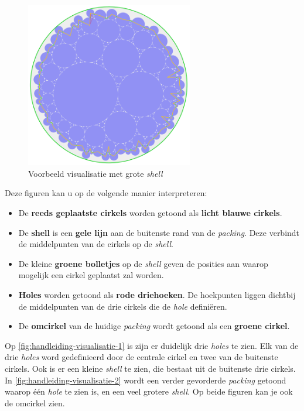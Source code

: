 \documentclass[12pt,a4paper,oneside]{book}
\begin{document}
\begin{figure}
  \centering
  \includegraphics[width=0.65\textwidth]{handleiding-visualisatie-2.png}
  \caption{Voorbeeld visualisatie met grote \textit{shell}} \label{fig:handleiding-visualisatie-2}
\end{figure}

Deze figuren kan u op de volgende manier interpreteren:

\begin{itemize}  
\item De \textbf{reeds geplaatste cirkels} worden getoond als \textbf{licht blauwe cirkels}.
\item De \textbf{shell} is een \textbf{gele lijn} aan de buitenste rand van de \textit{packing}. Deze verbindt de middelpunten van de cirkels op de \textit{shell}.
\item De kleine \textbf{groene bolletjes} op de \textit{shell} geven de posities aan waarop mogelijk een cirkel geplaatst zal worden.
\item \textbf{Holes} worden getoond als \textbf{rode driehoeken}. De hoekpunten liggen dichtbij de middelpunten van de drie cirkels die de \textit{hole} definiëren.
\item De \textbf{omcirkel} van de huidige \textit{packing} wordt getoond als een \textbf{groene cirkel}.
\end{itemize}

Op \autoref{fig:handleiding-visualisatie-1} is zijn er duidelijk drie \textit{holes} te zien.
Elk van de drie \textit{holes} word gedefinieerd door de centrale cirkel en twee van de buitenste cirkels.
Ook is er een kleine \textit{shell} te zien, die bestaat uit de buitenste drie cirkels.
In \autoref{fig:handleiding-visualisatie-2} wordt een verder gevorderde \textit{packing} getoond waarop één \textit{hole} te zien is, en een veel grotere \textit{shell}.
Op beide figuren kan je ook de omcirkel zien.
\end{document}
